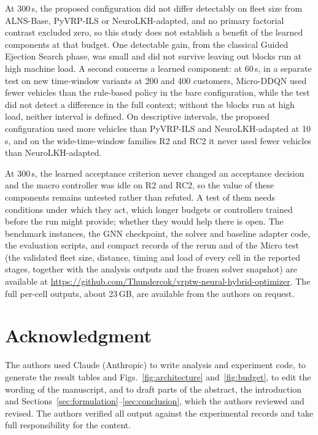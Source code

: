 \documentclass{ieeeaccess}
\begin{document}
At 300\,s, the proposed configuration did not differ detectably on fleet size from ALNS-Base, PyVRP-ILS or NeuroLKH-adapted, and no primary factorial contrast excluded zero, so this study does not establish a benefit of the learned components at that budget. One detectable gain, from the classical Guided Ejection Search phase, was small and did not survive leaving out blocks run at high machine load. A second concerns a learned component: at 60\,s, in a separate test on new time-window variants at 200 and 400 customers, Micro-DDQN used fewer vehicles than the rule-based policy in the bare configuration, while the test did not detect a difference in the full context; without the blocks run at high load, neither interval is defined. On descriptive intervals, the proposed configuration used more vehicles than PyVRP-ILS and NeuroLKH-adapted at 10\,s, and on the wide-time-window families R2 and RC2 it never used fewer vehicles than NeuroLKH-adapted.

At 300\,s, the learned acceptance criterion never changed an acceptance decision and the macro controller was idle on R2 and RC2, so the value of these components remains untested rather than refuted. A test of them needs conditions under which they act, which longer budgets or controllers trained before the run might provide; whether they would help there is open. The benchmark instances, the GNN checkpoint, the solver and baseline adapter code, the evaluation scripts, and compact records of the rerun and of the Micro test (the validated fleet size, distance, timing and load of every cell in the reported stages, together with the analysis outputs and the frozen solver snapshot) are available at \url{https://github.com/Thundercok/vrptw-neural-hybrid-optimizer}. The full per-cell outputs, about 23\,GB, are available from the authors on request.
\section*{Acknowledgment}
The authors used Claude (Anthropic) to write analysis and experiment code, to generate the result tables and Figs.~\ref{fig:architecture} and~\ref{fig:budget}, to edit the wording of the manuscript, and to draft parts of the abstract, the introduction and Sections~\ref{sec:formulation}--\ref{sec:conclusion}, which the authors reviewed and revised. The authors verified all output against the experimental records and take full responsibility for the content.
\end{document}
